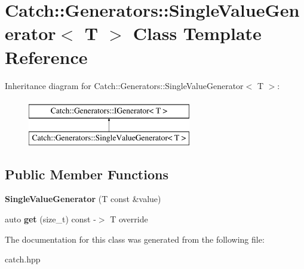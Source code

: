 \hypertarget{class_catch_1_1_generators_1_1_single_value_generator}{}\section{Catch\+:\+:Generators\+:\+:Single\+Value\+Generator$<$ T $>$ Class Template Reference}
\label{class_catch_1_1_generators_1_1_single_value_generator}
Inheritance diagram for Catch\+:\+:Generators\+:\+:Single\+Value\+Generator$<$ T $>$\+:\begin{figure}[H]
\begin{center}
\leavevmode
\includegraphics[height=2.000000cm]{class_catch_1_1_generators_1_1_single_value_generator}
\end{center}
\end{figure}
\subsection*{Public Member Functions}
\begin{DoxyCompactItemize}
\item 
\mbox{\label{class_catch_1_1_generators_1_1_single_value_generator_a4bed2ad14ffe04102d8135e2c82b3ace}} 
{\bfseries Single\+Value\+Generator} (T const \&value)
\item 
\mbox{\label{class_catch_1_1_generators_1_1_single_value_generator_ad03af3fe263136425595bfd2eec84209}} 
auto {\bfseries get} (size\+\_\+t) const -\/$>$ T override
\end{DoxyCompactItemize}


The documentation for this class was generated from the following file\+:\begin{DoxyCompactItemize}
\item 
catch.\+hpp\end{DoxyCompactItemize}

